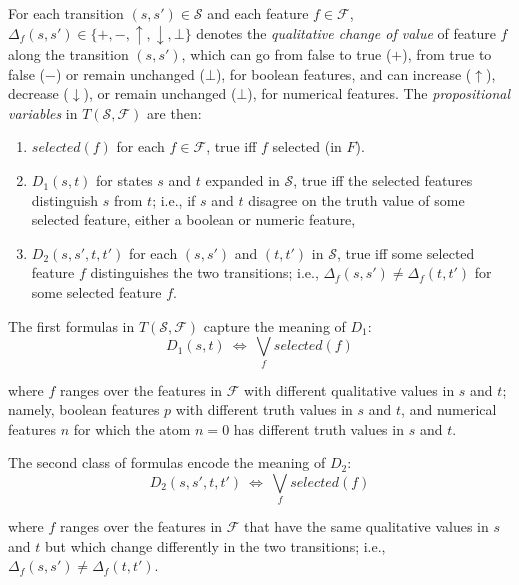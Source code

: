 \documentclass[letterpaper]{article} %
\newcommand{\F}{\mathcal{F}}
\renewcommand{\S}{\mathcal{S}}
\begin{document}
For each transition  $(s, s') \in \S$ and each  feature $f \in \F$,
$\Delta_f(s, s') \in \{+, -, \uparrow, \downarrow, \bot\}$  denotes the
\emph{qualitative change of value} of feature $f$ along the transition $(s, s')$,
which can go from false to true ($+$), from true to false ($-$) or remain
unchanged ($\bot$), for boolean features, and can increase ($\uparrow$),
decrease ($\downarrow$), or remain unchanged ($\bot$), for numerical features.
The \emph{propositional variables} in $T(\S,\F)$ are then:
\begin{enumerate}[{\small$\bullet$}]
  \item $selected(f)$ for each $f \in \F$, true iff $f$ selected (in $F$).
  \item $D_1(s,t)$ for states $s$ and $t$ expanded in $\S$,  true iff the
    selected features distinguish $s$ from $t$; i.e., if $s$ and $t$ disagree
    on the truth value of some selected feature, either a boolean or numeric feature,
  \item $D_2(s, s', t, t')$ for each $(s, s')$ and $(t, t')$ in $\S$,
    true iff some selected feature $f$ distinguishes the two transitions; i.e.,
    $\Delta_f(s, s')\not=\Delta_f(t,t')$ for some selected feature $f$.
\end{enumerate}

\medskip
\noindent The first formulas in $T(\S,\F)$ capture the meaning of $D_1$:
%
\begin{equation}
  \label{eq:d1}
  D_1(s, t) \ \Leftrightarrow\ \textstyle \bigvee_{f}  selected(f)
\end{equation}

\noindent where $f$ ranges over the features in $\F$ with  different qualitative
values in $s$ and $t$; namely, boolean features $p$ with different
truth values in $s$ and $t$, and numerical features $n$ for which
the atom $n=0$ has different truth values in $s$ and $t$.

The second class of formulas encode the meaning of $D_2$:
%
\begin{equation}
  \label{eq:d2}
  D_2(s, s', t, t') \ \Leftrightarrow\ \textstyle\bigvee_f  selected(f)
\end{equation}

\noindent where $f$ ranges over the features in $\F$ that have the same
qualitative values in $s$ and $t$ but which change differently in the two
transitions; i.e., $\Delta_f(s, s') \neq \Delta_f(t, t')$.
\end{document}
